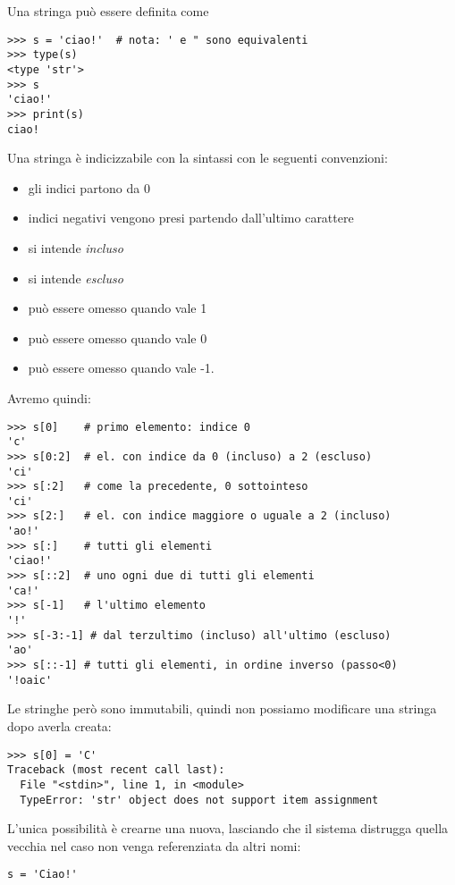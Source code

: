 Una stringa pu\`o essere definita come
\begin{verbatim}
>>> s = 'ciao!'  # nota: ' e " sono equivalenti
>>> type(s)
<type 'str'>
>>> s
'ciao!'
>>> print(s)
ciao!
\end{verbatim}
Una stringa \`e indicizzabile con la sintassi
 con le seguenti convenzioni:
\begin{itemize}
  \item gli indici partono da 0
  \item indici negativi vengono presi partendo dall'ultimo carattere
  \item {} si intende \emph{incluso}
  \item {} si intende \emph{escluso}
  \item {} pu\`o essere omesso quando vale 1
  \item {} pu\`o essere omesso quando vale 0
  \item {} pu\`o essere omesso quando vale -1.
\end{itemize}
Avremo quindi:
\begin{verbatim}
>>> s[0]    # primo elemento: indice 0
'c'
>>> s[0:2]  # el. con indice da 0 (incluso) a 2 (escluso)
'ci'
>>> s[:2]   # come la precedente, 0 sottointeso
'ci'
>>> s[2:]   # el. con indice maggiore o uguale a 2 (incluso)
'ao!'
>>> s[:]    # tutti gli elementi
'ciao!'
>>> s[::2]  # uno ogni due di tutti gli elementi
'ca!'
>>> s[-1]   # l'ultimo elemento
'!'
>>> s[-3:-1] # dal terzultimo (incluso) all'ultimo (escluso)
'ao'
>>> s[::-1] # tutti gli elementi, in ordine inverso (passo<0)
'!oaic'
\end{verbatim}
Le stringhe per\`o sono immutabili, quindi non possiamo modificare una
stringa dopo averla creata:
\begin{verbatim}
>>> s[0] = 'C'
Traceback (most recent call last):
  File "<stdin>", line 1, in <module>
  TypeError: 'str' object does not support item assignment
\end{verbatim}
L'unica possibilit\`a \`e crearne una nuova, lasciando che il sistema
distrugga quella vecchia nel caso non venga referenziata da altri
nomi:
\begin{verbatim}
s = 'Ciao!'
\end{verbatim}

